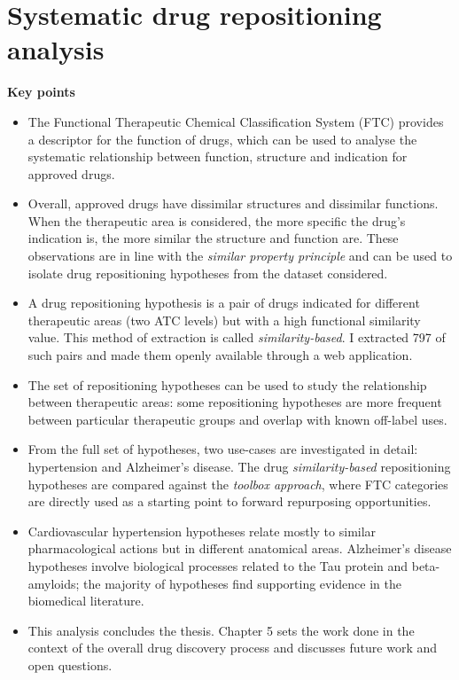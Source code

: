 \chapter{Systematic drug repositioning analysis}

\textbf{Key points}
\begin{itemize}
  \item The Functional Therapeutic Chemical Classification System (FTC) provides a descriptor for the function of drugs, which can be used to analyse the systematic relationship between function, structure and indication for approved drugs.
  \item Overall, approved drugs have dissimilar structures and dissimilar functions. When the therapeutic area is considered, the more specific the drug's indication is, the more similar the structure and function are. These observations are in line with the \emph{similar property principle} and can be used to isolate drug repositioning hypotheses from the dataset considered.
  \item A drug repositioning hypothesis is a pair of drugs indicated for different therapeutic areas (two ATC levels) but with a high functional similarity value. This method of extraction is called \emph{similarity-based}. I extracted 797 of such pairs and made them openly available through a web application.
  \item The set of repositioning hypotheses can be used to study the relationship between therapeutic areas: some repositioning hypotheses are more frequent between particular therapeutic groups and overlap with known off-label uses.
  \item From the full set of hypotheses, two use-cases are investigated in detail: hypertension and Alzheimer's disease. The drug \emph{similarity-based} repositioning hypotheses are compared against the \emph{toolbox approach}, where FTC categories are directly used as a starting point to forward repurposing opportunities.
  \item Cardiovascular hypertension hypotheses relate mostly to similar pharmacological actions but in different anatomical areas. Alzheimer's disease hypotheses involve biological processes related to the Tau protein and beta-amyloids; the majority of hypotheses find supporting evidence in the biomedical literature.
  \item This analysis concludes the thesis. Chapter 5 sets the work done in the context of the overall drug discovery process and discusses future work and open questions.
\end{itemize}

